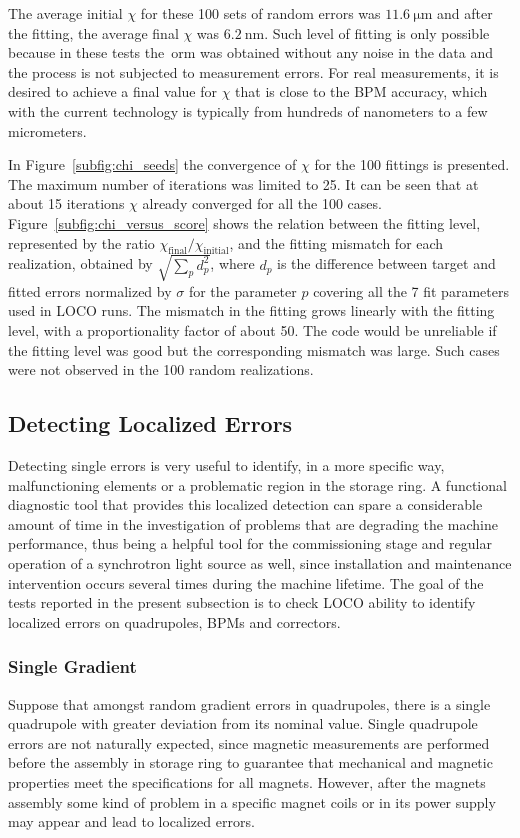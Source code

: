 The average initial $\chi$ for these 100 sets of random errors was $\SI{11.6}{\micro\meter}$ and after the fitting, the average final $\chi$ was $\SI{6.2}{\nano\meter}$. Such level of fitting is only possible because in these tests the~\gls{orm} was obtained without any noise in the data and the process is not subjected to measurement errors. For real measurements, it is desired to achieve a final value for $\chi$ that is close to the BPM accuracy, which with the current technology is typically from hundreds of nanometers to a few micrometers.

In Figure~\ref{subfig:chi_seeds} the convergence of $\chi$ for the 100 fittings is presented. The maximum number of iterations was limited to 25. It can be seen that at about 15 iterations $\chi$ already converged for all the 100 cases. Figure~\ref{subfig:chi_versus_score} shows the relation between the fitting level, represented by the ratio $\chi_{\mathrm{final}}/\chi_{\mathrm{initial}}$, and the fitting mismatch for each realization, obtained by $\sqrt{\sum_{p}d_p^2}$, where $d_p$ is the difference between target and fitted errors normalized by $\sigma$ for the parameter $p$ covering all the 7 fit parameters used in LOCO runs. The mismatch in the fitting grows linearly with the fitting level, with a proportionality factor of about 50. The code would be unreliable if the fitting level was good but the corresponding mismatch was large. Such cases were not observed in the 100 random realizations.
\subsection{Detecting Localized Errors}
Detecting single errors is very useful to identify, in a more specific way, malfunctioning elements or a problematic region in the storage ring. A functional diagnostic tool that provides this localized detection can spare a considerable amount of time in the investigation of problems that are degrading the machine performance, thus being a helpful tool for the commissioning stage and regular operation of a synchrotron light source as well, since installation and maintenance intervention occurs several times during the machine lifetime. The goal of the tests reported in the present subsection is to check LOCO ability to identify localized errors on quadrupoles, BPMs and correctors. 

\subsubsection{Single Gradient}
Suppose that amongst random gradient errors in quadrupoles, there is a single quadrupole with greater deviation from its nominal value. Single quadrupole errors are not naturally expected, since magnetic measurements are performed before the assembly in storage ring to guarantee that mechanical and magnetic properties meet the specifications for all magnets. However, after the magnets assembly some kind of problem in a specific magnet coils or in its power supply may appear and lead to localized errors.

